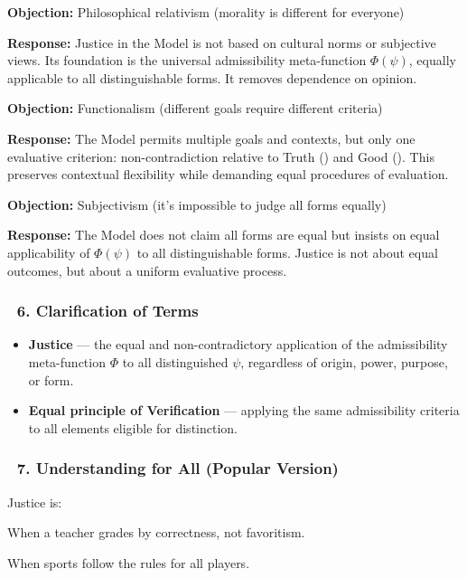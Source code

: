 \documentclass[12pt]{article}
\begin{document}
\textbf{Objection:} Philosophical relativism (morality is different for everyone)

\textbf{Response:} Justice in the Model is not based on cultural norms or subjective views. Its foundation is the universal admissibility meta-function $\Phi(\psi)$, equally applicable to all distinguishable forms. It removes dependence on opinion.

\bigskip

\textbf{Objection:} Functionalism (different goals require different criteria)

\textbf{Response:} The Model permits multiple goals and contexts, but only one evaluative criterion: non-contradiction relative to Truth (\text{[11.2]}) and Good (\text{[11.3]}). This preserves contextual flexibility while demanding equal procedures of evaluation.

\bigskip

\textbf{Objection:} Subjectivism (it’s impossible to judge all forms equally)

\textbf{Response:} The Model does not claim all forms are equal but insists on equal applicability of $\Phi(\psi)$ to all distinguishable forms. Justice is not about equal outcomes, but about a uniform evaluative process.

\subsubsection*{🔹 6. Clarification of Terms}

\begin{itemize}
\item \textbf{Justice} — the equal and non-contradictory application of the admissibility meta-function $\Phi$ to all distinguished $\psi$, regardless of origin, power, purpose, or form.
\item \textbf{Equal principle of Verification} — applying the same admissibility criteria to all elements eligible for distinction.
\end{itemize}

\subsubsection*{🔹 7. Understanding for All (Popular Version)}

Justice is:

When a teacher grades by correctness, not favoritism.

When sports follow the rules for all players.
\end{document}
